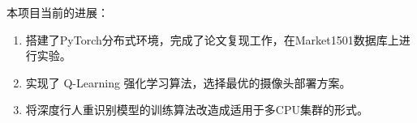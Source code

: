 本项目当前的进展：

\begin{enumerate}
\item 搭建了PyTorch分布式环境，完成了论文复现工作，在Market1501\cite{zheng2015scalable}数据库上进行实验。
\item 实现了 Q-Learning 强化学习算法，选择最优的摄像头部署方案。
\item 将深度行人重识别模型的训练算法改造成适用于多CPU集群的形式。
\end{enumerate}

























